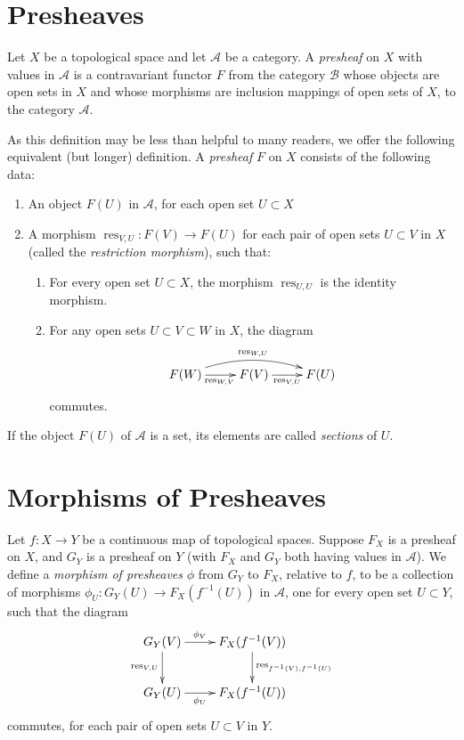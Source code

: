 \documentclass[12pt]{article}
\newcommand{\A}{\mathcal{A}}
\newcommand{\res}{\operatorname{res}}
\begin{document}
\newtheorem{theorem}{Theorem}
\newtheorem{proposition}[theorem]{Proposition}
\newtheorem{lemma}[theorem]{Lemma}
\newtheorem{corollary}[theorem]{Corollary}

\theoremstyle{definition}
\newtheorem{definition}[theorem]{Definition}
\newtheorem{example}[theorem]{Example}

\section{Presheaves}

Let $X$ be a topological space and let $\A$ be a category. A
\emph{presheaf} on $X$ with values in $\A$ is a contravariant functor
$F$ from the category $\mathcal{B}$ whose objects are open sets in $X$ and whose morphisms are inclusion mappings of open sets of $X$, to
the category $\A$.

As this definition may be less than helpful to many readers, we offer
the following equivalent (but longer) definition. A \emph{presheaf} $F$
on $X$ consists of the following data:
\begin{enumerate}
\item An object $F(U)$ in $\A$, for each open set $U \subset X$
\item A morphism $\res_{V,U}\colon F(V) \to F(U)$ for each pair of open
sets $U \subset V$ in $X$ (called the \emph{restriction morphism}), such
that:
\begin{enumerate}
\item For every open set $U \subset X$, the morphism $\res_{U,U}$ is
the identity morphism.
\item For any open sets $U \subset V \subset W$ in $X$, the diagram
$$
\xymatrix{
F(W) \ar@/^1pc/[rr]^{\res_{W,U}} \ar[r]_{\res_{W,V}} & F(V)
\ar[r]_{\res_{V,U}} & F(U)
}
$$
commutes.
\end{enumerate}
\end{enumerate}
If the object $F(U)$ of $\A$ is a set, its elements are called \emph{sections} of $U$.

\section{Morphisms of Presheaves}

Let $f\colon X \to Y$ be a continuous map of topological spaces. Suppose
$F_X$ is a presheaf on $X$, and $G_Y$ is a presheaf on $Y$ (with $F_X$
and $G_Y$ both having values in $\A$). We define a \emph{morphism of
presheaves} $\phi$ from $G_Y$ to $F_X$, relative to $f$, to be a
collection of morphisms $\phi_U\colon G_Y(U) \to F_X(f^{-1}(U))$ in $\A$,
one for every open set $U \subset Y$, such that the diagram
$$
\xymatrix{
G_Y(V) \ar[r]^-{\phi_V} \ar[d]_{\res_{V,U}} & F_X(f^{-1}(V))
\ar[d]^{\res_{f^{-1}(V),f^{-1}(U)}} \\
G_Y(U) \ar[r]_-{\phi_U} & F_X(f^{-1}(U))
}
$$
commutes, for each pair of open sets $U \subset V$ in $Y$.
\end{document}

